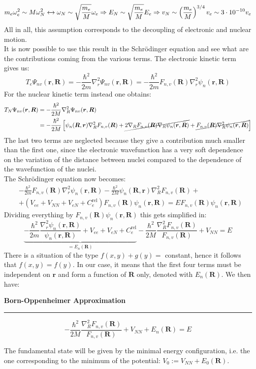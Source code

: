 \documentclass[10.75pt,a4paper,openright,bottom=2cm]{article}
\renewcommand{\Vec}[1]{\boldsymbol{#1}}
\begin{document}
\[
m_e\omega_e^2\sim M\omega_N^2\xleftrightarrow[]{}\omega_N\sim\sqrt{\frac{m_e}{M}}\omega_e\Rightarrow E_N\sim\sqrt{\frac{m_e}{M}}E_e\Rightarrow v_N\sim\left(\frac{m_e}{M}\right)^{3/4}v_e\sim3\cdot10^{-10}v_e
\]
All in all, this assumption corresponds to the decoupling of electronic and nuclear motion.\\
It is now possible to use this result in the Schr\"odinger equation and see what are the contributions coming from the various terms. The electronic kinetic term gives us:
\[
T_e\Psi_{nv}(\Vec{r},\Vec{R})=-\frac{\hbar^2}{2m}\nabla_r^2\Psi_{nv}(\Vec{r},\Vec{R})=-\frac{\hbar^2}{2m}F_{n,v}(\Vec{R})\nabla_r^2\psi_n(\Vec{r},\Vec{R})
\]
For the nuclear kinetic term instead one obtains:
\begin{align*}
T_N\Psi_{nv}(\Vec{r},\Vec{R})&=-\frac{\hbar^2}{2M}\nabla_R^2\Psi_{nv}(\Vec{r},\Vec{R})\\
&=-\frac{\hbar^2}{2M}\left[\psi_n(\Vec{R},\Vec{r})\nabla_R^2F_{n,v}(\Vec{R})+\cancel{2\nabla_RF_{n,v}(\Vec{R})\nabla_R\psi_n(\Vec{r},\Vec{R})}+\cancel{F_{n,v}(\Vec{R})\nabla_R^2\psi_n(\Vec{r},\Vec{R})}\right]
\end{align*}
The last two terms are neglected because they give a contribution much smaller than the first one, since the electronic wavefunction has a very soft dependence on the variation of the distance between nuclei compared to the dependence of the wavefunction of the nuclei.\\
The Schr\"odinger equation now becomes:
\begin{align*}
&-\frac{\hbar^2}{2m}F_{n,v}(\Vec{R})\nabla_r^2\psi_n(\Vec{r},\Vec{R})-\frac{\hbar^2}{2M}\psi_n(\Vec{R},\Vec{r})\nabla_R^2F_{n,v}(\Vec{R})+\\
&+(V_{ee}+V_{NN}+V_{eN}+C_e^{\text{rel}})F_{n,v}(\Vec{R})\psi_n(\Vec{r},\Vec{R})=EF_{n,v}(\Vec{R})\psi_n(\Vec{r},\Vec{R})
\end{align*}
Dividing everything by $F_{n,v}(\Vec{R})\psi_n(\Vec{r},\Vec{R})$ this gets simplified in:
\[
\underbrace{-\frac{\hbar^2}{2m}\frac{\nabla_r^2\psi_n(\Vec{r},\Vec{R})}{\psi_n(\Vec{r},\Vec{R})}+V_{ee}+V_{eN}+C_e^{\text{rel}}}_{=E_n(\Vec{R})}-\frac{\hbar^2}{2M}\frac{\nabla_R^2F_{n,v}(\Vec{R})}{F_{n,v}(\Vec{R})}+V_{NN}=E
\]
There is a situation of the type $f(x,y)+g(y)=$ constant, hence it follows that $f(x,y)=f(y)$. In our case, it means that the first four terms must be independent on $\Vec{r}$ and form a function of $\Vec{R}$ only, denoted with $E_n(\Vec{R})$. We then have:
\begin{mybox}
\textbf{Born-Oppenheimer Approximation}
\hrule
\vspace{0.2cm}
\[
-\frac{\hbar^2}{2M}\frac{\nabla_R^2F_{n,v}(\Vec{R})}{F_{n,v}(\Vec{R})}+V_{NN}+E_n(\Vec{R})=E
\]
\end{mybox}\noindent
The fundamental state will be given by the minimal energy configuration, i.e. the one corresponding to the minimum of the potential: $V_0:=V_{NN}+E_0(\Vec{R})$.
\end{document}
